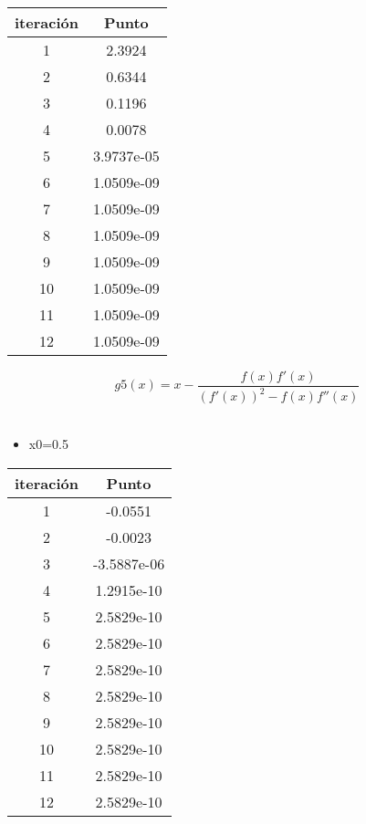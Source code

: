 \documentclass{udpreport}
\begin{document}
\begin{enumerate}
\begin{enumerate}
\begin{table}[H]
\begin{tabular} { |c|c|}
        \hline
        iteración  &  Punto\\
        \hline
        1 &     2.3924  \\
         \hline
        2 &    0.6344   \\
         \hline
        3 &   0.1196 \\
         \hline
        4 &    0.0078   \\
         \hline
        5 &   3.9737e-05  \\
         \hline
        6 &   1.0509e-09    \\
         \hline
        7 & 1.0509e-09   \\
         \hline
        8 &  1.0509e-09  \\
         \hline
        9 &  1.0509e-09      \\
         \hline
        10 &  1.0509e-09      \\
         \hline
        11 & 1.0509e-09   \\
         \hline
        12 &  1.0509e-09     \\
        \hline
        
        \end{tabular}
        
    \end{table}
    \newpage
    \begin{equation}
 g5(x) = x-\frac{f(x)f'(x)}
{(f'(x))^2-f(x)f''(x)}
\end{equation}
\\
 \begin{itemize}

\item x0=0.5
\end{itemize}
\begin{table}[H]
    \centering
        \begin{tabular} { |c|c|}
        
        \hline
        iteración  &  Punto\\
        \hline
        1 &  -0.0551      \\
         \hline
        2 &    -0.0023   \\
         \hline
        3 &  -3.5887e-06 \\
         \hline
        4 &  1.2915e-10    \\
         \hline
        5 &    2.5829e-10  \\
         \hline
        6 &  2.5829e-10     \\
         \hline
        7 &     2.5829e-10 \\
         \hline
        8 &  2.5829e-10    \\
         \hline
        9 &       2.5829e-10   \\
         \hline
        10 &    2.5829e-10     \\
         \hline
        11 &    2.5829e-10 \\
         \hline
        12 &   2.5829e-10  \\
        \hline
        

\end{tabular}
\end{table}
\end{enumerate}
\end{enumerate}
\end{document}
